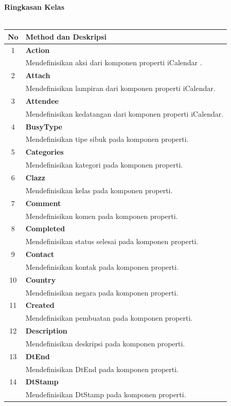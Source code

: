 	\noindent \textbf{Ringkasan Kelas}\cite{ical}\\ \\
	\begin{tabular}{|c|p{12cm}|}
		\hline
		\textbf{No} & \textbf{Method dan Deskripsi} \\ \hline \hline
		1 & \textbf{Action}\\
			&	Mendefinisikan aksi dari komponen properti iCalendar .\\ \hline
		2 & \textbf{Attach}\\
			&	Mendefinisikan lampiran dari komponen properti iCalendar. \\ \hline
		3 & \textbf{Attendee}\\
			&	Mendefinisikan kedatangan dari komponen properti iCalendar.\\ \hline
		4 & \textbf{BusyType}\\
			&	Mendefinisikan tipe sibuk pada komponen properti.\\ \hline
		5 & \textbf{Categories}\\
			&	Mendefinisikan kategori pada komponen properti.\\ \hline
		6 & \textbf{Clazz}\\
			&	Mendefinisikan kelas pada komponen properti.\\ \hline
		7 & \textbf{Comment}\\
			&	Mendefinisikan komen pada komponen properti.\\ \hline
		8 & \textbf{Completed}\\
			&	Mendefinisikan status selesai pada komponen properti.\\ \hline
		9 & \textbf{Contact}\\
			&	Mendefinisikan kontak pada komponen properti.\\ \hline
		10 & \textbf{Country}\\
			&	Mendefinisikan negara pada komponen properti.\\ \hline
		11 & \textbf{Created}\\
			&	Mendefinisikan pembuatan pada komponen properti.\\ \hline
		12 & \textbf{Description}\\
			&	Mendefinisikan deskripsi pada komponen properti.\\ \hline
		13 & \textbf{DtEnd}\\
			&	Mendefinisikan DtEnd pada komponen properti.\\ \hline
		14 & \textbf{DtStamp}\\
			&	Mendefinisikan DtStamp pada komponen properti.\\ \hline

\end{tabular}
